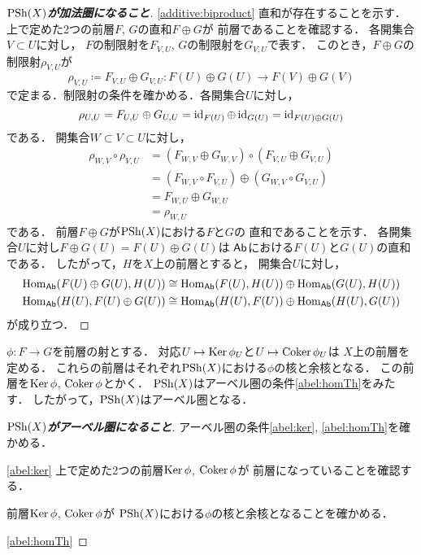 \begin{proof}[\textbf{\(\mathrm{PSh}(X)\)が加法圏になること}]
    \eqref{additive:biproduct}
    直和が存在することを示す．
    上で定めた2つの前層\(F\), \(G\)の直和\(F\oplus G\)が
    前層であることを確認する．
    各開集合\(V\subset U\)に対し，
    \(F\)の制限射を\(F_{V,U}\), \(G\)の制限射を\(G_{V,U}\)で表す．
    このとき，\(F\oplus G\)の制限射\(\rho_{V,U}\)が
    \[
        \rho_{V,U}\coloneqq F_{V,U}\oplus G_{V,U}\colon F(U)\oplus G(U)\to F(V)\oplus G(V)
    \]
    で定まる．制限射の条件を確かめる．各開集合\(U\)に対し，
    \[
        \rho_{U,U}
        =F_{U,U}\oplus G_{U,U}
        =\mathop{\mathrm{id}}\nolimits_{F(U)}\oplus\mathop{\mathrm{id}}\nolimits_{G(U)}
        =\mathop{\mathrm{id}}\nolimits_{F(U)\oplus G(U)}
    \]である．
    開集合\(W\subset V\subset U\)に対し，
    \begin{align*}
        \rho_{W,V}\circ\rho_{V,U}
        &=(F_{W,V}\oplus G_{W,V})\circ(F_{V,U}\oplus G_{V,U})\\
        &=(F_{W,V}\circ F_{V,U})\oplus(G_{W,V}\circ G_{V,U})\\
        &=F_{W,U}\oplus G_{W,U}\\
        &=\rho_{W,U}
    \end{align*}
    である．
    前層\(F\oplus G\)が\(\mathrm{PSh}(X)\)における\(F\)と\(G\)の
    直和であることを示す．
    各開集合\(U\)に対し\(F\oplus G(U)=F(U)\oplus G(U)\)は
    \(\mathop{\textsf{Ab}}\nolimits\)における\(F(U)\)と\(G(U)\)の直和である．
    したがって，\(H\)を\(X\)上の前層とすると，
    開集合\(U\)に対し，
    \begin{align*}
        \mathop{\mathrm{Hom}}\nolimits_{\mathop{\textsf{Ab}}\nolimits}(F(U)\oplus G(U),H(U))
        &\cong\mathop{\mathrm{Hom}}\nolimits_{\mathop{\textsf{Ab}}\nolimits}(F(U),H(U))\oplus\mathop{\mathrm{Hom}}\nolimits_{\mathop{\textsf{Ab}}\nolimits}(G(U),H(U))\\
        \mathop{\mathrm{Hom}}\nolimits_{\mathop{\textsf{Ab}}\nolimits}(H(U),F(U)\oplus G(U))
        &\cong\mathop{\mathrm{Hom}}\nolimits_{\mathop{\textsf{Ab}}\nolimits}(H(U),F(U))\oplus\mathop{\mathrm{Hom}}\nolimits_{\mathop{\textsf{Ab}}\nolimits}(H(U),G(U))
    \end{align*}
    が成り立つ．
\end{proof}

\(\phi\colon F\to G\)を前層の射とする．
対応\(U\mapsto \mathop{\mathrm{Ker}}\nolimits{\phi_U}\)と\(U\mapsto \mathop{\mathrm{Coker}}\nolimits{\phi_U}\)は
\(X\)上の前層を定める．
これらの前層はそれぞれ\(\mathrm{PSh}(X)\)における\(\phi\)の核と余核となる．
この前層を\(\mathop{\mathrm{Ker}}\nolimits{\phi}\), \(\mathop{\mathrm{Coker}}\nolimits{\phi}\)とかく．
\(\mathrm{PSh}(X)\)はアーベル圏の条件\eqref{abel:homTh}をみたす．
したがって，\(\mathrm{PSh}(X)\)はアーベル圏となる．
\begin{proof}[\textbf{\(\mathrm{PSh}(X)\)がアーベル圏になること}]
    アーベル圏の条件\eqref{abel:ker}, \eqref{abel:homTh}を確かめる．

    \eqref{abel:ker} 
    上で定めた2つの前層\(\mathop{\mathrm{Ker}}\nolimits{\phi}\), \(\mathop{\mathrm{Coker}}\nolimits{\phi}\)が
    前層になっていることを確認する．

    前層\(\mathop{\mathrm{Ker}}\nolimits{\phi}\), \(\mathop{\mathrm{Coker}}\nolimits{\phi}\)が
    \(\mathrm{PSh}(X)\)における\(\phi\)の核と余核となることを確かめる．

    \eqref{abel:homTh} 

\end{proof}









